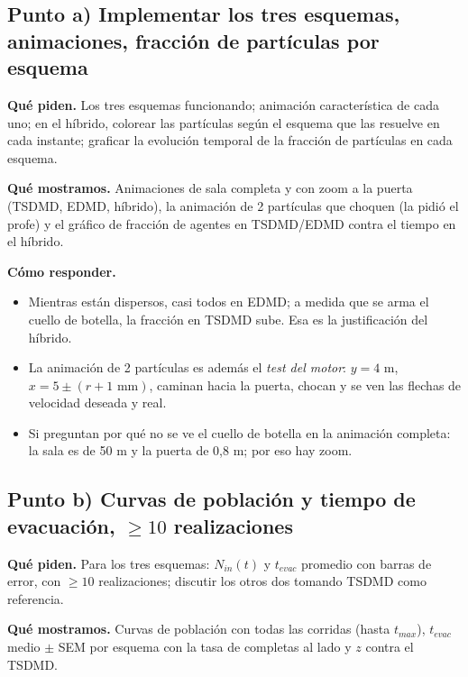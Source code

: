 \documentclass[10.5pt,a4paper]{article}
\begin{document}
\subsection{Punto a) Implementar los tres esquemas, animaciones, fracción de partículas por esquema}
\textbf{Qué piden.} Los tres esquemas funcionando; animación característica de cada uno; en el híbrido, colorear las partículas según el esquema que las resuelve en cada instante; graficar la evolución temporal de la fracción de partículas en cada esquema.

\textbf{Qué mostramos.} Animaciones de sala completa y con zoom a la puerta (TSDMD, EDMD, híbrido), la animación de 2 partículas que choquen (la pidió el profe) y el gráfico de fracción de agentes en TSDMD/EDMD contra el tiempo en el híbrido.

\textbf{Cómo responder.}
\begin{itemize}
\item Mientras están dispersos, casi todos en EDMD; a medida que se arma el cuello de botella, la fracción en TSDMD sube. Esa es la justificación del híbrido.
\item La animación de 2 partículas es además el \emph{test del motor}: $y=4$ m, $x=5\pm(r+1\text{ mm})$, caminan hacia la puerta, chocan y se ven las flechas de velocidad deseada y real.
\item Si preguntan por qué no se ve el cuello de botella en la animación completa: la sala es de 50 m y la puerta de 0,8 m; por eso hay zoom.
\end{itemize}

\subsection{Punto b) Curvas de población y tiempo de evacuación, $\geq10$ realizaciones}
\textbf{Qué piden.} Para los tres esquemas: $N_{in}(t)$ y $t_{evac}$ promedio con barras de error, con $\geq10$ realizaciones; discutir los otros dos tomando TSDMD como referencia.

\textbf{Qué mostramos.} Curvas de población con todas las corridas (hasta $t_{max}$), $t_{evac}$ medio $\pm$ SEM por esquema con la tasa de completas al lado y $z$ contra el TSDMD.
\end{document}
